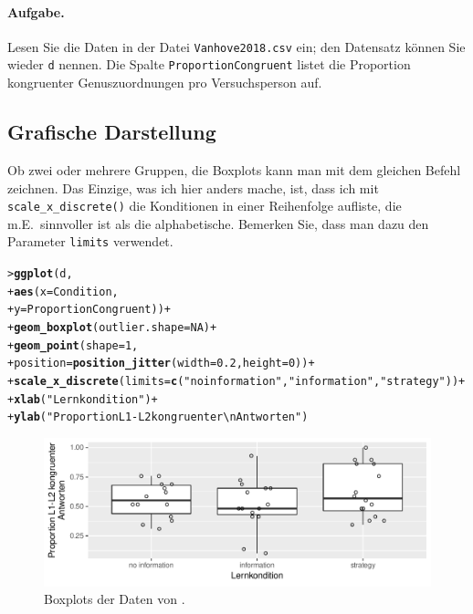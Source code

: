 \documentclass[oneside, 10pt]{book}\usepackage[]{graphicx}\usepackage[]{xcolor}
\makeatletter
\newcommand{\hlnum}[1]{\textcolor[rgb]{0.686,0.059,0.569}{#1}}%
\newcommand{\hlstr}[1]{\textcolor[rgb]{0.192,0.494,0.8}{#1}}%
\newcommand{\hlopt}[1]{\textcolor[rgb]{0,0,0}{#1}}%
\newcommand{\hlstd}[1]{\textcolor[rgb]{0.345,0.345,0.345}{#1}}%
\newcommand{\hlkwc}[1]{\textcolor[rgb]{0.333,0.667,0.333}{#1}}%
\newcommand{\hlkwd}[1]{\textcolor[rgb]{0.737,0.353,0.396}{\textbf{#1}}}%
\newenvironment{kframe}{%
 \def\at@end@of@kframe{}%
 \ifinner\ifhmode%
  \def\at@end@of@kframe{\end{minipage}}%
  \begin{minipage}{\columnwidth}%
 \fi\fi%
 \def\FrameCommand##1{\hskip\@totalleftmargin \hskip-\fboxsep
 \colorbox{shadecolor}{##1}\hskip-\fboxsep
     \hskip-\linewidth \hskip-\@totalleftmargin \hskip\columnwidth}%
 \MakeFramed {\advance\hsize-\width
   \@totalleftmargin\z@ \linewidth\hsize
   \@setminipage}}%
 {\par\unskip\endMakeFramed%
 \at@end@of@kframe}
\newenvironment{knitrout}{}{} %
\makeatother
\begin{document}
\paragraph{Aufgabe.}
Lesen Sie die Daten in der Datei \texttt{Vanhove2018.csv} ein;
den Datensatz können Sie wieder \texttt{d} nennen.
Die Spalte \texttt{ProportionCongruent}
listet die Proportion kongruenter Genuszuordnungen pro Versuchsperson
auf.%




\subsection{Grafische Darstellung}
Ob zwei oder mehrere Gruppen, die Boxplots kann man
mit dem gleichen Befehl zeichnen.
Das Einzige, was ich hier anders mache, ist,
dass ich mit \texttt{scale\_x\_discrete()} die
Konditionen in einer Reihenfolge
aufliste, die m.E.\ sinnvoller ist als die alphabetische.
Bemerken Sie, dass man dazu den Parameter \texttt{limits}
verwendet.

\begin{knitrout}
\color{fgcolor}\begin{kframe}
\begin{alltt}
\hlstd{> }\hlkwd{ggplot}\hlstd{(d,}
\hlstd{+ }       \hlkwd{aes}\hlstd{(}\hlkwc{x} \hlstd{= Condition,}
\hlstd{+ }           \hlkwc{y} \hlstd{= ProportionCongruent))} \hlopt{+}
\hlstd{+ }  \hlkwd{geom_boxplot}\hlstd{(}\hlkwc{outlier.shape} \hlstd{=} \hlnum{NA}\hlstd{)} \hlopt{+}
\hlstd{+ }  \hlkwd{geom_point}\hlstd{(}\hlkwc{shape} \hlstd{=} \hlnum{1}\hlstd{,}
\hlstd{+ }             \hlkwc{position} \hlstd{=} \hlkwd{position_jitter}\hlstd{(}\hlkwc{width} \hlstd{=} \hlnum{0.2}\hlstd{,} \hlkwc{height} \hlstd{=} \hlnum{0}\hlstd{))} \hlopt{+}
\hlstd{+ }  \hlkwd{scale_x_discrete}\hlstd{(}\hlkwc{limits} \hlstd{=} \hlkwd{c}\hlstd{(}\hlstr{"no information"}\hlstd{,} \hlstr{"information"}\hlstd{,} \hlstr{"strategy"}\hlstd{))} \hlopt{+}
\hlstd{+ }  \hlkwd{xlab}\hlstd{(}\hlstr{"Lernkondition"}\hlstd{)} \hlopt{+}
\hlstd{+ }  \hlkwd{ylab}\hlstd{(}\hlstr{"Proportion L1-L2 kongruenter\textbackslash{}nAntworten"}\hlstd{)}
\end{alltt}
\end{kframe}\begin{figure}[tp]

{\centering \includegraphics[width=.7\textwidth]{figs/unnamed-chunk-263-1} 

}

\caption{Boxplots der Daten von \citet{Vanhove2018}.\label{fig:vanhove2018}}\label{fig:unnamed-chunk-263}
\end{figure}

\end{knitrout}
\end{document}
